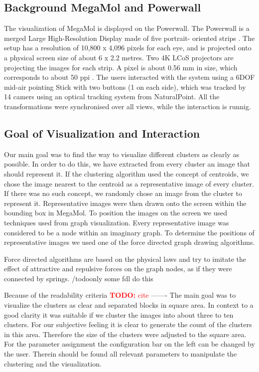 \documentclass[journal]{vgtc}       %
\newcommand{\todo}[1]{\textcolor{red}{\textbf{TODO:} #1}}
\begin{document}
\subsection{Background MegaMol and Powerwall}


The visualization of MegaMol is displayed on the Powerwall.
The  Powerwall is a merged Large High-Resolution Display made of five portrait- oriented
strips . The setup has  a resolution of 10,800 x 4,096 pixels
for each eye, and is projected onto a physical screen size of about 6 x 2.2 metres. 
Two 4K LCoS projectors are projecting
the images for each strip.
A pixel is about 0.56 mm  in size, which corresponds to about 50 ppi .
The users interacted with the system using a 6DOF mid-air
pointing Stick with two buttons (1 on each side), which was tracked by 14 camers
using an optical tracking system from NaturalPoint. 
All the transformations were synchronised over all views, while the interaction is runnig.




\subsection{Goal of Visualization and Interaction}
Our main goal was to find the way to visualize different clusters as clearly as possible. In order to do this, we have extracted from every cluster an image that should represent it. If the clustering algorithm used the concept of centroids, we chose the image nearest to the centroid as a representative image of every cluster. If there was no such concept, we randomly chose an image from the cluster to represent it. 
Representative images were then drawn onto the screen within the bounding box in MegaMol.
To position the images on the screen we used techniques used from graph visualization. Every representative image was considered to be a node within an imaginary graph. To determine the positions of representative images we used one of the force directed graph drawing algorithms. 

Force directed algorithms are based on the physical laws and try to imitate the effect of attractive and repulsive forces on the graph nodes, as if they were connected by springs. /todo{only some fdl do this}

Because of the readability criteria \todo{cite}
-------
The main goal was to visualize the clusters as clear and separated blocks in square area. In context to a good clarity it was suitable if we cluster the images into about three to ten clusters. For our subjective feeling it is clear to generate the count of the clusters in this area. Therefore the size of the clusters were adjusted to the square area. For the parameter assignment the configuration bar on the left can be changed by the user. Therein should be found all relevant parameters to manipulate the clustering and the visualization.
\end{document}
